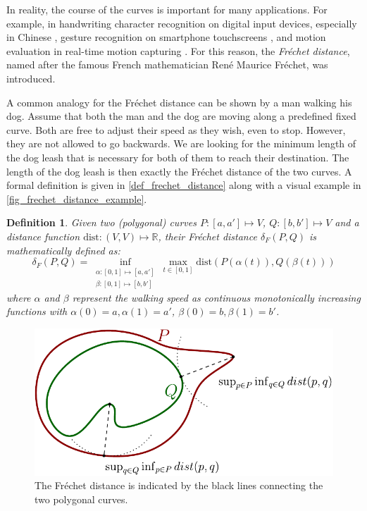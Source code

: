 \documentclass[
oneside,
fontsize=11pt
]{scrartcl}
\newtheorem{mydef}{Definition}
\begin{document}
In reality, the course of the curves is important for many applications. 
For example, in handwriting character recognition on digital input devices, especially in Chinese \cite{chanin_david_hanzi_nodate},
gesture recognition on smartphone touchscreens \cite{hu_research_2022}, %
and motion evaluation in real-time motion capturing \cite{qiao_real-time_2017, shehu_curve_2012}. %
For this reason, the \textit{Fréchet distance}, named after the famous French mathematician René Maurice Fréchet, was introduced.

A common analogy for the Fréchet distance can be shown by a man walking his dog. 
Assume that both the man and the dog are moving along a predefined fixed curve. 
Both are free to adjust their speed as they wish, even to stop. 
However, they are not allowed to go backwards. 
We are looking for the minimum length of the dog leash 
that is necessary for both of them to reach their destination. 
The length of the dog leash is then exactly the Fréchet distance of the two curves.
A formal definition is given in \autoref{def_frechet_distance} 
along with a visual example in \autoref{fig_frechet_distance_example}.

\begin{mydef}
  \label{def_frechet_distance}
  Given two (polygonal) curves $P: [a,a'] \mapsto V$, $Q: [b,b'] \mapsto V$ and a distance function $\text{dist}: (V,V) \mapsto \mathbb{R}$, 
  their Fréchet distance $\delta_{F}(P,Q)$ is mathematically defined as: 
  $$\delta_{F}(P,Q) = \inf_{\substack{\alpha: [0,1] \mapsto [a, a'] \\ \beta: [0,1] \mapsto [b, b']}} \max_{t \in [0,1]} \text{dist}(P(\alpha(t)), Q(\beta(t)))$$
  where $\alpha$ and $\beta$ represent the walking speed as 
  continuous monotonically increasing functions with
  $\alpha(0) = a, \alpha(1) = a'$, 
  $\beta(0) =b, \beta(1) =b'$.
\end{mydef}

\begin{figure}[ht]
  \centering
  \includegraphics[width=\textwidth]{images/hausdorff/hausdorff-distance-example.pdf}
  \caption{The Fréchet distance is indicated by the black lines connecting the two polygonal curves.}
  \label{fig_frechet_distance_example}
\end{figure}
\end{document}
